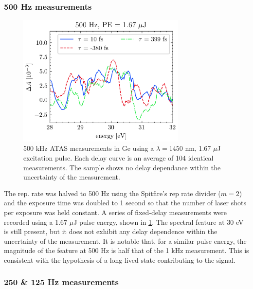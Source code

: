 \subsubsection{500 Hz measurements}

\begin{figure}
	\centering
	\includegraphics[width=0.75\textwidth]{figures/chap3/StaticOD_avg_500Hz_1p67uJ.png}
	\caption{500 kHz ATAS measurements in Ge using a $\lambda = 1450$ nm, 1.67 $\mu$J excitation pulse. Each delay curve is an average of 104 identical measurements. The sample shows no delay dependance within the uncertainty of the measurement.}
	\label{fig:500Hz_Ge_ATAS:delays}
\end{figure}

The rep. rate was halved to 500 Hz using the Spitfire's rep rate divider ($m=2$) and the exposure time was doubled to 1 second so that the number of laser shots per exposure was held constant. A series of fixed-delay measurements were recorded using a 1.67 $\mu$J pulse energy, shown in \cref{fig:500Hz_Ge_ATAS:delays}. The spectral feature at 30 eV is still present, but it does not exhibit any delay dependence within the uncertainty of the measurement. It is notable that, for a similar pulse energy, the magnitude of the feature at 500 Hz is half that of the 1 kHz measurement. This is consistent with the hypothesis of a long-lived state contributing to the signal.

\subsubsection{250 \& 125 Hz measurements}

